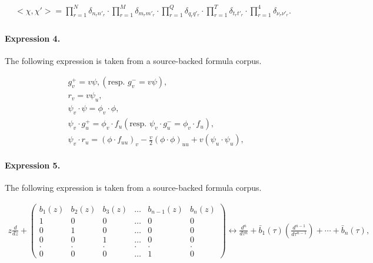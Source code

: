 \documentclass[11pt]{article}
\begin{document}
\begin{align*}\begin{array}{l}<\chi,\chi'>=\displaystyle \prod_{r=1}^{N}\delta_{n_{r}n'_{r}}\cdot\displaystyle \prod_{r=1}^{M}\delta_{m_{r}m'_{r}}\cdot\displaystyle \prod_{r=1}^{Q}\delta_{q_{r}q'_{r}}\cdot\displaystyle \prod_{r=1}^{T}\delta_{t_{r}t'_{r}}\cdot\displaystyle \prod_{r=1}^{4}\delta_{\nu_{r}\nu'_{r}}.\end{array}\end{align*}

\paragraph{Expression 4.} The following expression is taken from a source-backed formula corpus.

\begin{align*} & g^{+}_v=v \psi, (\text{resp. } g^{-}_v=v \psi), \\ & r_v=v \psi_u, \\ & \psi_v\cdot \psi=\phi_v\cdot \phi, \\ & \psi_v\cdot g^{+}_u =\phi_v\cdot f_u (\text{resp. } \psi_v\cdot g^{-}_u=\phi_v\cdot f_u), \\ & \psi_v\cdot r_{u} =(\phi\cdot f_{uu})_v -\frac{v}2{(\phi\cdot \phi)_{uu}}+v (\psi_u\cdot \psi_u) , \end{align*}

\paragraph{Expression 5.} The following expression is taken from a source-backed formula corpus.

\begin{align*}z\frac{d}{dz}+\left( \begin{array}{cccccc}b_{1}(z)&b_{2}(z)&b_{3}(z)&\ldots&b_{n-1}(z)&b_{n}(z)\\1&0&0&\ldots&0&0\\0&1&0&\ldots&0&0\\0&0&1&\ldots&0&0\\.&.&.&.&.&.\\0&0&0&\ldots&1&0 \end{array}\right)\leftrightarrow \frac{d^n}{d\tau^n}+\bar{b}_{1}(\tau)(\frac{d^{n-1}}{d\tau^{n-1}})+\cdots+\bar{b}_{n}(\tau),\end{align*}
\end{document}
